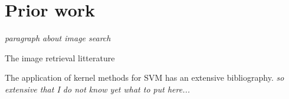 \section{Prior work}
\emph{\color{red} paragraph about image search}

The image retrieval litterature 


The application of kernel methods for SVM has an extensive bibliography. \emph{\color{red} so extensive that I do not know yet what to put here...}